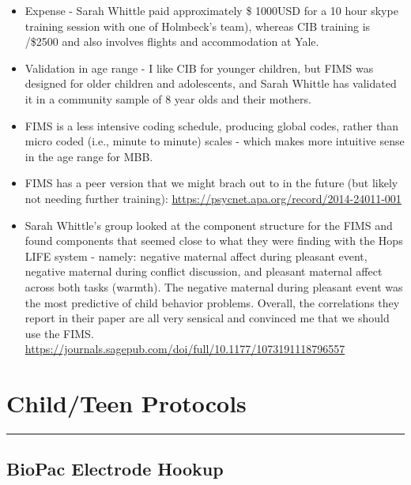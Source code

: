 \documentclass[]{book}
\providecommand{\tightlist}{%
  \setlength{\itemsep}{0pt}\setlength{\parskip}{0pt}}
\begin{document}
\begin{itemize}
  \begin{itemize}
  \tightlist
  \item
    Expense - Sarah Whittle paid approximately \$ 1000USD for a 10 hour skype training session with one of Holmbeck's team), whereas CIB training is /\$2500 and also involves flights and accommodation at Yale.
  \item
    Validation in age range - I like CIB for younger children, but FIMS was designed for older children and adolescents, and Sarah Whittle has validated it in a community sample of 8 year olds and their mothers.
  \item
    FIMS is a less intensive coding schedule, producing global codes, rather than micro coded (i.e., minute to minute) scales - which makes more intuitive sense in the age range for MBB.
  \item
    FIMS has a peer version that we might brach out to in the future (but likely not needing further training): \url{https://psycnet.apa.org/record/2014-24011-001}
  \item
    Sarah Whittle's group looked at the component structure for the FIMS and found components that seemed close to what they were finding with the Hops LIFE system - namely: negative maternal affect during pleasant event, negative maternal during conflict discussion, and pleasant maternal affect across both tasks (warmth). The negative maternal during pleasant event was the most predictive of child behavior problems. Overall, the correlations they report in their paper are all very sensical and convinced me that we should use the FIMS. \url{https://journals.sagepub.com/doi/full/10.1177/1073191118796557}
  \end{itemize}
\end{itemize}

\hypertarget{childteen-protocols}{%
\section{Child/Teen Protocols}\label{childteen-protocols}}

\begin{center}\rule{0.5\linewidth}{0.5pt}\end{center}

\hypertarget{biopac-electrode-hookup}{%
\subsection{BioPac Electrode Hookup}\label{biopac-electrode-hookup}}
\end{document}
